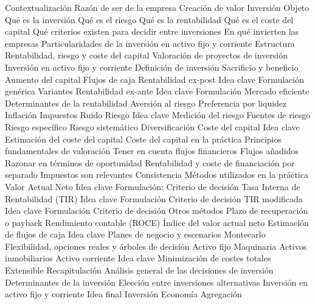 \documentclass{nuevotema}
\begin{document}
\begin{esquema}[enumerate]
	\1[] 
		\2 Contextualización
			\3 Razón de ser de la empresa
			\3 Creación de valor
			\3 Inversión
		\2 Objeto
			\3 Qué es la inversión
			\3 Qué es el riesgo
			\3 Qué es la rentabilidad
			\3 Qué es el coste del capital
			\3 Qué criterios existen para decidir entre inversiones
			\3 En qué invierten las empresas
			\3 Particularidades de la inversión en activo fijo y corriente
		\2 Estructura
			\3 Rentabilidad, riesgo y coste del capital
			\3 Valoración de proyectos de inversión
			\3 Inversión en activo fijo y corriente
	\1 
		\2 Definición de inversión
			\3 Sacrificio y beneficio
			\3 Aumento del capital
			\3 Flujos de caja
		\2 Rentabilidad ex-post
			\3 Idea clave
			\3 Formulación genérica
			\3 Variantes
		\2 Rentabilidad ex-ante
			\3 Idea clave
			\3 Formulación
			\3 Mercado eficiente
		\2 Determinantes de la rentabilidad
			\3 Aversión al riesgo
			\3 Preferencia por liquidez
			\3 Inflación
			\3 Impuestos
			\3 Ruido
		\2 Riesgo
			\3 Idea clave
			\3 Medición del riesgo
			\3 Fuentes de riesgo
			\3 Riesgo específico
			\3 Riesgo sistemático
			\3 Diversificación
		\2 Coste del capital
			\3 Idea clave
			\3 Estimación del coste del capital
			\3 Coste del capital en la práctica
	\1 
		\2 Principios fundamentales de valoración
			\3 Tener en cuenta flujos financieros
			\3 Flujos añadidos
			\3 Razonar en términos de oportunidad
			\3 Rentabilidad y coste de financiación por separado
			\3 Impuestos son relevantes
			\3 Consistencia
			\3 Métodos utilizados en la práctica
		\2 Valor Actual Neto
			\3 Idea clave
			\3 Formulación:
			\3 Criterio de decisión
		\2 Tasa Interna de Rentabilidad (TIR)
			\3 Idea clave
			\3 Formulación
			\3 Criterio de decisión
		\2 TIR modificada
			\3 Idea clave
			\3 Formulación
			\3 Criterio de decisión
		\2 Otros métodos
			\3 Plazo de recuperación o payback
			\3 Rendimiento contable (ROCE)
			\3 Índice del valor actual neto
		\2 Estimación de flujos de caja
			\3 Idea clave
			\3 Planes de negocio y escenarios
			\3 Montecarlo
			\3 Flexibilidad, opciones reales y árboles de decisión
	\1 
		\2 Activo fijo
			\3 Maquinaria
			\3 Activos inmobiliarios
		\2 Activo corriente
			\3 Idea clave
			\3 Minimización de costes totales
			\3 Extensible
	\1[] 
		\2 Recapitulación
			\3 Análisis general de las decisiones de inversión
			\3 Determinantes de la inversión
			\3 Elección entre inversiones alternativas
			\3 Inversión en activo fijo y corriente
		\2 Idea final
			\3 Inversión
			\3 Economía
			\3 Agregación

\end{esquema}
\end{document}
